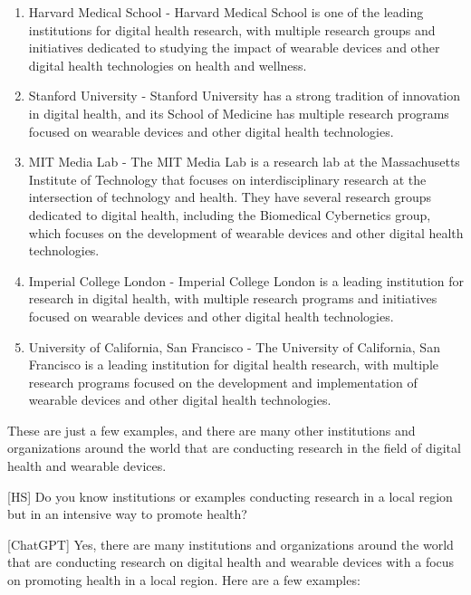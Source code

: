 \documentclass[
]{book}
\providecommand{\tightlist}{%
  \setlength{\itemsep}{0pt}\setlength{\parskip}{0pt}}
\theoremstyle{definition}
\theoremstyle{definition}
\theoremstyle{definition}
\theoremstyle{definition}
\theoremstyle{remark}
\begin{document}
\begin{enumerate}
\def\labelenumi{\arabic{enumi}.}
\tightlist
\item
  Harvard Medical School - Harvard Medical School is one of the leading institutions for digital health research, with multiple research groups and initiatives dedicated to studying the impact of wearable devices and other digital health technologies on health and wellness.
\item
  Stanford University - Stanford University has a strong tradition of innovation in digital health, and its School of Medicine has multiple research programs focused on wearable devices and other digital health technologies.
\item
  MIT Media Lab - The MIT Media Lab is a research lab at the Massachusetts Institute of Technology that focuses on interdisciplinary research at the intersection of technology and health. They have several research groups dedicated to digital health, including the Biomedical Cybernetics group, which focuses on the development of wearable devices and other digital health technologies.
\item
  Imperial College London - Imperial College London is a leading institution for research in digital health, with multiple research programs and initiatives focused on wearable devices and other digital health technologies.
\item
  University of California, San Francisco - The University of California, San Francisco is a leading institution for digital health research, with multiple research programs focused on the development and implementation of wearable devices and other digital health technologies.
\end{enumerate}

These are just a few examples, and there are many other institutions and organizations around the world that are conducting research in the field of digital health and wearable devices.

{[}HS{]} Do you know institutions or examples conducting research in a local region but in an intensive way to promote health?

{[}ChatGPT{]} Yes, there are many institutions and organizations around the world that are conducting research on digital health and wearable devices with a focus on promoting health in a local region. Here are a few examples:
\end{document}
